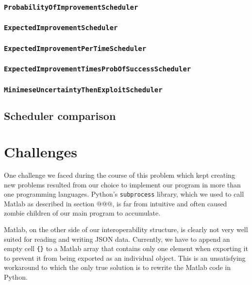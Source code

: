\documentclass[a4paper,12pt,twoside,openright]{report}
\begin{document}
\subsubsection{\texttt{ProbabilityOfImprovementScheduler}}



\subsubsection{\texttt{ExpectedImprovementScheduler}}

\subsubsection{\texttt{ExpectedImprovementPerTimeScheduler}}


\subsubsection{\texttt{ExpectedImprovementTimesProbOfSuccessScheduler}}

\subsubsection{\texttt{MinimeseUncertaintyThenExploitScheduler}}


\subsection{Scheduler comparison}




\section{Challenges}
One challenge we faced during the course of this problem which kept creating new problems resulted from our choice to implement our program in more than one programming languages. Python's \texttt{subprocess} library, which we used to call Matlab as described in section @@@, is far from intuitive and often caused zombie children of our main program to accumulate. 

Matlab, on the other side of our interoperability structure, is clearly not very well suited for reading and writing JSON data. Currently, we have to append an empty cell \texttt{\{\}} to a Matlab array that contains only one element when exporting it to prevent it from being exported as an individual object. This is an unsatisfying workaround to which the only true solution is to rewrite the Matlab code in Python.
\end{document}
